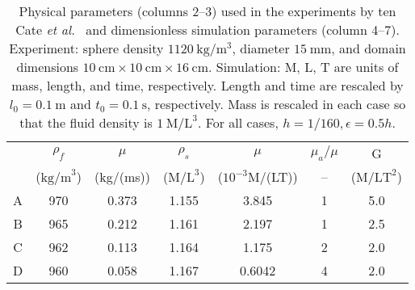 \documentclass[times, 10pt]{article}
\begin{document}
\begin{multicols}{2}
             \begin{table*}
                \scriptsize
                \centering
                \caption{Physical parameters (columns 2--3) used in the experiments by ten Cate \textit{et al.}~\cite{tenCate02}
                and dimensionless simulation parameters (column 4--7).
                Experiment: sphere density $1120~\text{kg}/\text{m}^3$, diameter $15~\text{mm}$, and domain dimensions $10~\text{cm} \times 10~\text{cm} \times 16~\text{cm}$.
                Simulation: M, L, T are units of mass, length, and time, respectively.  Length and time are rescaled by $ l_0 = 0.1~\text{m}$ and $t_0 = 0.1~\text{s}$, respectively. Mass is rescaled in each case so that the fluid density is $1~\text{M/L}^3$.
                For all cases, $h = 1/160, \epsilon = 0.5h$.
                }\label{table:params}
                \begin{tabular} {| c | c | c || c | c | c | c |}
                    \hline
                   & $\rho_f$ & $\mu$  & $\rho_s$ & $\mu$  & $\mu_a/\mu$ & G   \\
                   & \tiny{($\text{kg/m}^3$)}  & \tiny{(kg/(ms))} & \tiny{($\text{M/L}^3$)}  & \tiny{($10^{-3}$M/(LT))} & -- & \tiny{($\text{M/LT}^2$)} \\
                    \hline \hline
                    A & 970 & 0.373 & 1.155 & 3.845 & 1 & 5.0 \\
                    \hline
                    B & 965 & 0.212 & 1.161 & 2.197 & 1& 2.5 \\
                    \hline
                    C & 962 & 0.113 & 1.164 & 1.175 & 2 & 2.0 \\
                    \hline
                    D & 960 & 0.058 & 1.167 & 0.6042 & 4 & 2.0 \\
                    \hline
                \end{tabular}
            \end{table*}



\end{multicols}
\end{document}
